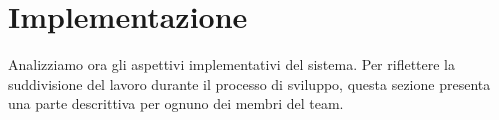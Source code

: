 \newpage
\section{Implementazione}
Analizziamo ora gli aspettivi implementativi del sistema. Per
riflettere la suddivisione del lavoro durante il processo di sviluppo, questa sezione presenta
una parte descrittiva per ognuno dei membri del team.




